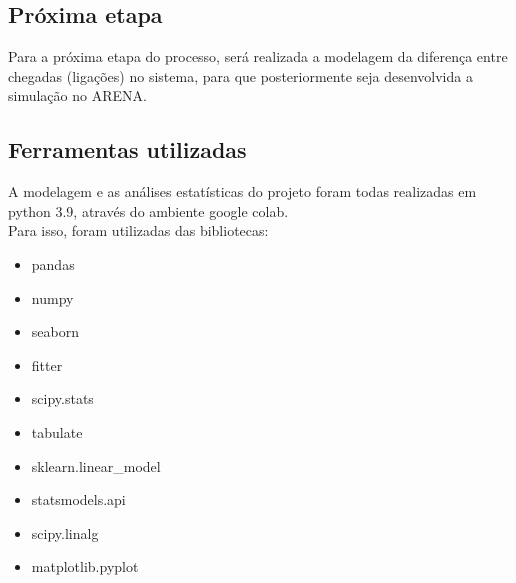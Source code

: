 \subsection{Próxima etapa}
Para a próxima etapa do processo, será realizada a modelagem da diferença entre chegadas (ligações) no sistema, para que posteriormente seja desenvolvida a simulação no ARENA.

\subsection{Ferramentas utilizadas}
A modelagem e as análises estatísticas do projeto foram todas realizadas em python 3.9, através do ambiente google colab.\\
Para isso, foram utilizadas das bibliotecas:
\begin{itemize}
    \item pandas
    \item numpy
    \item seaborn
    \item fitter
    \item scipy.stats
    \item tabulate
    \item sklearn.linear\_model
    \item statsmodels.api
    \item scipy.linalg
    \item matplotlib.pyplot
    \end{itemize}